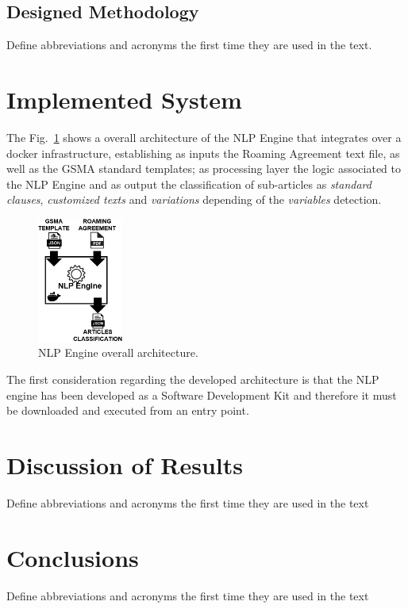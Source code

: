 \documentclass[conference]{style/IEEEtran}
\begin{document}
\subsection{Designed Methodology}
Define abbreviations and acronyms the first time they are used in the text.

\section{Implemented System}
The Fig.~\ref{fig1} shows a overall architecture of the NLP Engine that integrates over a docker infrastructure, establishing as inputs the Roaming Agreement text file, as well as the GSMA standard templates; as processing layer the logic associated to the NLP Engine and as output the classification of sub-articles as \textit{standard clauses}, \textit{customized texts} and \textit{variations} depending of the \textit{variables} detection.

\begin{figure}[htbp]
\centerline{\includegraphics[width=0.25\textwidth]{images/NLP_Engine.png}}
\caption{NLP Engine overall architecture.}
\label{fig1}
\end{figure}

The first consideration regarding the developed architecture is that the NLP engine has been developed as a Software Development Kit and therefore it must be downloaded and executed from an entry point. 

\section{Discussion of Results}
Define abbreviations and acronyms the first time they are used in the text

\section{Conclusions}
Define abbreviations and acronyms the first time they are used in the text 
\end{document}
